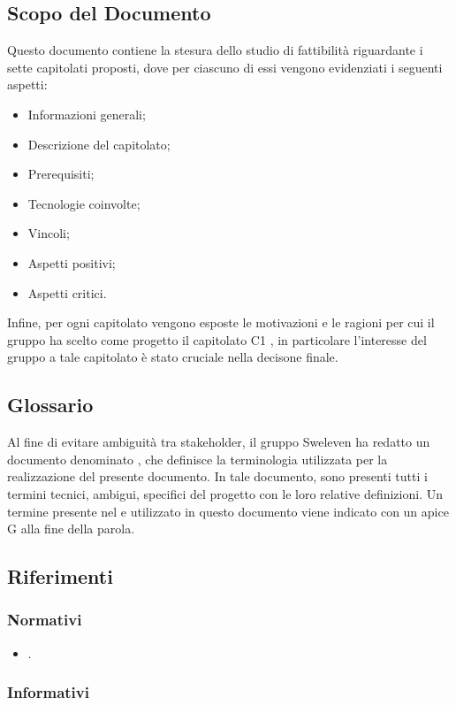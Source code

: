\subsection{Scopo del Documento}
Questo documento contiene la stesura dello studio di fattibilità riguardante i sette capitolati proposti, dove per ciascuno di essi vengono evidenziati i seguenti aspetti:
\begin{itemize}
    \item Informazioni generali;
    \item Descrizione del capitolato;
    \item Prerequisiti;
    \item Tecnologie coinvolte;
    \item Vincoli;
    \item Aspetti positivi;
    \item Aspetti critici.
\end{itemize}
Infine, per ogni capitolato vengono esposte le motivazioni e le ragioni per cui il gruppo ha scelto come progetto il capitolato C1 \NomeProgetto{}, in particolare l’interesse del gruppo a tale capitolato è stato cruciale nella decisone finale.
\subsection{Glossario}
Al fine di evitare ambiguità tra stakeholder, il gruppo Sweleven ha redatto un documento denominato \Glossariov, che definisce la terminologia utilizzata per la realizzazione del presente documento.
In tale documento, sono presenti tutti i termini tecnici, ambigui, specifici del progetto con le loro relative definizioni.
Un termine presente nel \Glossariov e utilizzato in questo documento viene indicato con un apice G alla fine della parola.
\subsection{Riferimenti}

\subsubsection{Normativi}
\begin{itemize}
\item \NdPv {}.
\end{itemize}

\subsubsection{Informativi}

